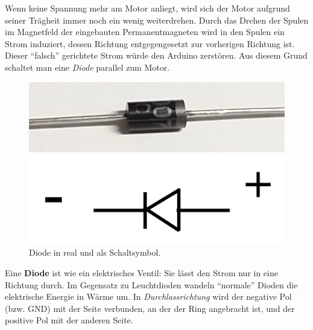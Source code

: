 Wenn keine Spannung mehr am Motor anliegt, wird sich der Motor aufgrund seiner Trägheit immer noch ein wenig weiterdrehen. Durch das Drehen der Spulen im Magnetfeld der eingebauten Permanentmagneten wird in den Spulen ein Strom induziert, dessen Richtung entgegengesetzt zur vorherigen Richtung ist. Dieser \enquote{falsch} gerichtete Strom würde den Arduino zerstören. Aus diesem Grund schaltet man eine \emph{Diode} parallel zum Motor.

\begin{figure}
	\centering
	\includegraphics[width=0.75\linewidth]{./pics/diode2.jpg}
	
	\includegraphics[width=0.75\linewidth,angle=180]{./Zeichnungen/diode-schaltsym.png}
	\caption{Diode in real und als Schaltsymbol.}
\end{figure}
Eine \textbf{Diode} ist wie ein elektrisches Ventil: Sie lässt den Strom nur in eine Richtung durch. Im Gegensatz zu Leuchtdioden wandeln \enquote{normale} Dioden die elektrische Energie in Wärme um. In \emph{Durchlassrichtung} wird der negative Pol (bzw. GND) mit der Seite verbunden, an der der Ring angebracht ist, und der positive Pol mit der anderen Seite.

%		

